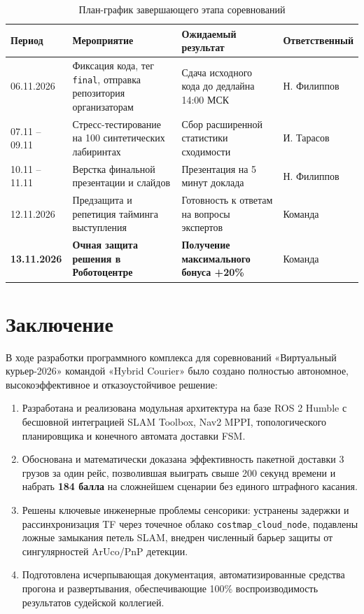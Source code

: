 \documentclass[a4paper,11pt]{article}
\begin{document}
\begin{table}[htbp]
\centering
\small
\begin{tabularx}{\textwidth}{p{2.8cm}p{5.0cm}p{4.5cm}X}
\toprule
\textbf{Период} & \textbf{Мероприятие} & \textbf{Ожидаемый результат} & \textbf{Ответственный} \\
\midrule
06.11.2026 & Фиксация кода, тег \texttt{final}, отправка репозитория организаторам & Сдача исходного кода до дедлайна 14:00 МСК & Н. Филиппов \\
07.11 -- 09.11 & Стресс-тестирование на 100 синтетических лабиринтах & Сбор расширенной статистики сходимости & И. Тарасов \\
10.11 -- 11.11 & Верстка финальной презентации и слайдов & Презентация на 5 минут доклада & Н. Филиппов \\
12.11.2026 & Предзащита и репетиция тайминга выступления & Готовность к ответам на вопросы экспертов & Команда \\
\textbf{13.11.2026} & \textbf{Очная защита решения в Роботоцентре} & \textbf{Получение максимального бонуса +20\%} & Команда \\
\bottomrule
\end{tabularx}
\caption{План-график завершающего этапа соревнований}
\label{tab:roadmap}
\end{table}

\section{Заключение}
В ходе разработки программного комплекса для соревнований «Виртуальный курьер-2026» командой «Hybrid Courier» было создано полностью автономное, высокоэффективное и отказоустойчивое решение:
\begin{enumerate}
    \item Разработана и реализована модульная архитектура на базе ROS 2 Humble с бесшовной интеграцией SLAM Toolbox, Nav2 MPPI, топологического планировщика и конечного автомата доставки FSM.
    \item Обоснована и математически доказана эффективность пакетной доставки 3 грузов за один рейс, позволившая выиграть свыше 200 секунд времени и набрать \textbf{184 балла} на сложнейшем сценарии без единого штрафного касания.
    \item Решены ключевые инженерные проблемы сенсорики: устранены задержки и рассинхронизация TF через точечное облако \texttt{costmap\_cloud\_node}, подавлены ложные замыкания петель SLAM, внедрен численный барьер защиты от сингулярностей ArUco/PnP детекции.
    \item Подготовлена исчерпывающая документация, автоматизированные средства прогона и развертывания, обеспечивающие 100\% воспроизводимость результатов судейской коллегией.
\end{enumerate}
\end{document}
